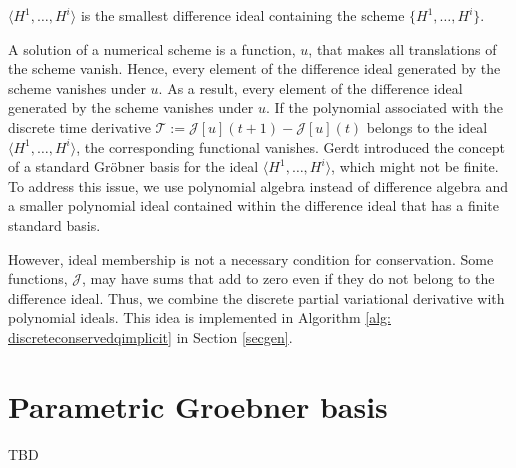 \documentclass[runningheads]{llncs}
\newcommand{\1}{\chi}
\begin{document}
\begin{definition}
	$\langle H^1,\ldots,H^i\rangle$ is the smallest difference ideal containing the scheme $\{H^1,\ldots,H^i\}$.
\end{definition}


A solution of a numerical scheme is a function, $u$, that makes all translations of the scheme vanish. Hence, every element of the difference ideal generated by the scheme vanishes under $u$. As a result, every element of the difference ideal generated by the scheme vanishes under $u$. If the polynomial associated with the discrete time derivative  $\mathcal{T}:=\mathcal{J}[u](t+1)-\mathcal{J}[u](t)$
belongs to the ideal $\langle H^1,\ldots,H^i\rangle$, the corresponding functional vanishes. 
 Gerdt introduced the concept of a standard  Gr{\"o}bner basis for the ideal $\langle H^1,\ldots,H^i\rangle$, which might not be finite. To address this issue, we use polynomial algebra instead of difference algebra and a smaller polynomial ideal contained within the difference ideal that has a finite standard basis.
 
 However, ideal membership is not  a necessary condition for conservation. Some functions, $\mathcal{J}$,
 may have sums that add to zero even if they do not belong to the difference ideal. Thus, we combine the discrete partial variational derivative with polynomial ideals. This idea is implemented in Algorithm \ref{alg: discreteconservedqimplicit} in Section \ref{secgen}.

\section{Parametric Groebner basis}
\label{pgb}

TBD
\end{document}
